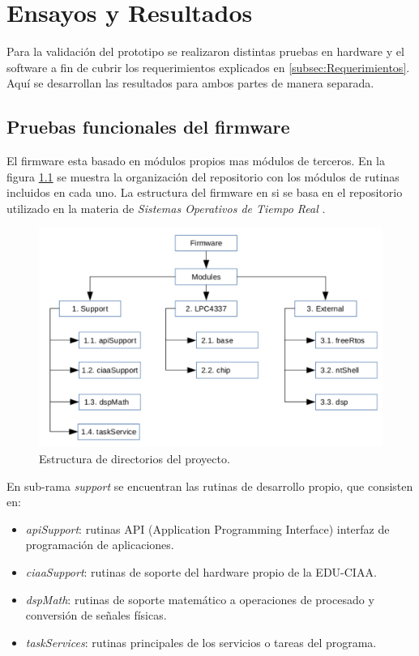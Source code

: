 \chapter{Ensayos y Resultados}
\label{Chapter4}

Para la validación del prototipo se realizaron distintas pruebas en hardware y el software a fin de cubrir los requerimientos explicados en \ref{subsec:Requerimientos}. Aquí se desarrollan las resultados para ambos partes de manera separada.

\section{ Pruebas funcionales del firmware }
\label{sec:pruebasFW}

El firmware esta basado en módulos propios mas módulos de terceros. En la figura \ref{fig:diag_Repositorio} se muestra la organización del repositorio \citep{firmwareTP} con los módulos de rutinas incluidos en cada uno. La estructura del firmware en si se basa en el repositorio utilizado en la materia de \textit{Sistemas Operativos de Tiempo Real} \citep{ws_ridolfi}.   
\begin{figure}[h!]
	\centering
	\includegraphics[width=1.0\textwidth]{Figures/Cap_4/diagrama_repositorio}
	\caption{Estructura de directorios del proyecto.}
	\label{fig:diag_Repositorio}
\end{figure}

En sub-rama \textit{support} se encuentran las rutinas de desarrollo propio, que consisten en:
\begin{itemize}
\item \textit{apiSupport}: rutinas API (Application Programming Interface) interfaz de programación de aplicaciones.
\item \textit{ciaaSupport}: rutinas de soporte del hardware propio de la EDU-CIAA.
\item \textit{dspMath}: rutinas de soporte matemático a operaciones de procesado y conversión de señales físicas.
\item \textit{taskServices}: rutinas principales de los servicios o tareas del programa.
\end{itemize}

